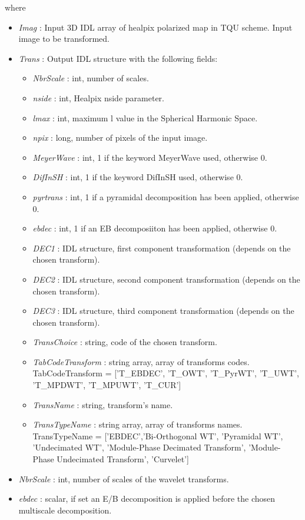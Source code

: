 where
\begin{itemize}
\item {\em Imag} : Input 3D IDL array of healpix polarized map in TQU scheme. Input image to be transformed.
\item {\em Trans} : Output IDL structure with the following fields:
\begin{itemize}
\item {\em NbrScale} : int, number of scales.
\item {\em nside} : int, Healpix nside parameter.
\item {\em lmax} : int, maximum l value in the Spherical Harmonic Space.
\item {\em npix} : long, number of pixels of the input image.
\item {\em MeyerWave} : int, 1 if the keyword MeyerWave used, otherwise 0.
\item {\em DifInSH} : int, 1 if the keyword DifInSH used, otherwise 0.
\item {\em pyrtrans} : int, 1 if a pyramidal decomposition has been applied, otherwise 0.
\item {\em ebdec} : int, 1 if an EB decomposiiton has been applied, otherwise 0.
\item {\em DEC1} : IDL structure, first component transformation (depends on the chosen transform).
\item {\em DEC2} : IDL structure, second component transformation (depends on the chosen transform).
\item {\em DEC3} : IDL structure, third component transformation (depends on the chosen transform).
\item {\em TransChoice} : string, code of the chosen transform.
\item {\em TabCodeTransform} : string array, array of transforms codes. TabCodeTransform = ['T\_EBDEC', 'T\_OWT', 'T\_PyrWT', 'T\_UWT', 'T\_MPDWT', 'T\_MPUWT', 'T\_CUR']
\item {\em TransName} : string, transform's name.
\item {\em TransTypeName} : string array, array of transforms names. 
TransTypeName = ['EBDEC','Bi-Orthogonal WT', 'Pyramidal WT', 'Undecimated WT', 'Module-Phase Decimated Transform', 'Module-Phase Undecimated Transform', 'Curvelet']
\end{itemize}
\item {\em NbrScale} : int, number of scales of the wavelet transforms.
\item {\em ebdec} : scalar, if set an E/B decomposition is applied before the chosen multiscale decomposition. 

\end{itemize}
